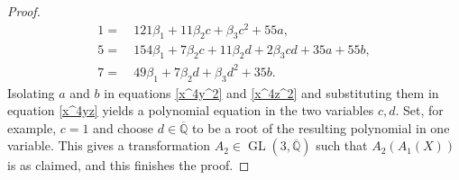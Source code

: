 \documentclass[10pt,a4paper]{amsart}
\newcommand{\QQ}{\mathbb{Q}}
\begin{document}
\begin{proof}
\begin{align} 
    1 = & \ 121\beta_1+11\beta_2c+\beta_3c^2+55a, \label{x^4y^2} \\
    5 = & \ 154\beta_1+7\beta_2c+11\beta_2d+2\beta_3cd+35a+55b, \label{x^4yz} \\
    7 = & \ 49\beta_1+7\beta_2d+\beta_3d^2+35b. \label{x^4z^2}
\end{align}
Isolating $a$ and $b$ in equations \eqref{x^4y^2} and \eqref{x^4z^2} and substituting them in equation \eqref{x^4yz} yields a polynomial equation in the two variables $c,d$. Set, for example, $c=1$ and choose $d\in \overline{\QQ}$ to be a root of the resulting polynomial in one variable. This gives a transformation $A_2\in \operatorname{GL}(3, \overline{\QQ})$ such that $A_2(A_1(X))$ is as claimed, and this finishes the proof. 
\end{proof}
\end{document}
